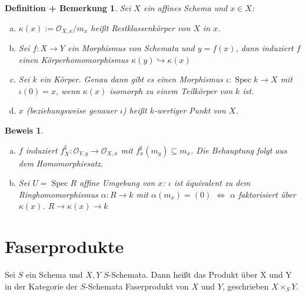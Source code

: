 \documentclass[a4paper,oneside]{scrbook}
\theoremstyle{break}
\newtheorem{DefBem}[Def]{Definition + Bemerkung}
\theoremstyle{nonumberbreak}
\theoremstyle{nonumberplain}
\newtheorem{Bew}{Beweis}
\theoremstyle{break}
\newcommand{\Spec}{%
	\ensuremath{\operatorname{Spec}}%
}
\begin{document}
\begin{DefBem}
Sei $X$ ein affines Schema und $x \in X$:
\begin{enumerate}[(a)]
	\item $\kappa(x):=\mathcal{O}_{X,x}/m_x$ heißt Restklassenkörper von $X$ in $x$.
	\item Sei $f: X \rightarrow Y$ ein Morphismus von Schemata und $y=f(x)$, dann induziert $f$ einen Körperhomomorphismus $\kappa(y) \hookrightarrow \kappa(x)$
	\item Sei $k$ ein Körper. Genau dann gibt es einen Morphismus $\iota: \Spec k \rightarrow X$ mit $\iota(0) = x$, wenn $\kappa(x)$ isomorph zu einem Teilkörper von $k$ ist.
	\item $x$ (beziehungsweise genauer $\iota$) heißt $k$-wertiger Punkt von $X$.
\end{enumerate}
\end{DefBem}
\begin{Bew}
	\begin{enumerate}[(b)]
		\item $f$ induziert $f^\sharp_X: \mathcal{O}_{Y,y} \rightarrow \mathcal{O}_{X,x}$ mit $f^\sharp_x(m_y) \subseteq m_x$. Die Behauptung folgt aus dem Homomorphiesatz.
		\item Sei $U = \Spec R$ affine Umgebung von $x$: $\iota$ ist äquivalent zu dem Ringhomomorphismus $\alpha: R \rightarrow k $ mit $\alpha(m_x)=(0)$ $\Leftrightarrow$ $\alpha$ faktorisiert über $\kappa(x)$. $R \rightarrow \kappa(x) \rightarrow k$
	\end{enumerate}
\end{Bew}

\section{Faserprodukte}

Sei $S$ ein Schema und $X,Y$ $S$-Schemata. Dann heißt das Produkt über X und Y in der Kategorie der $S$-Schemata Faserprodukt von $X$ und $Y$, geschrieben $X \times_S Y$.
\end{document}
